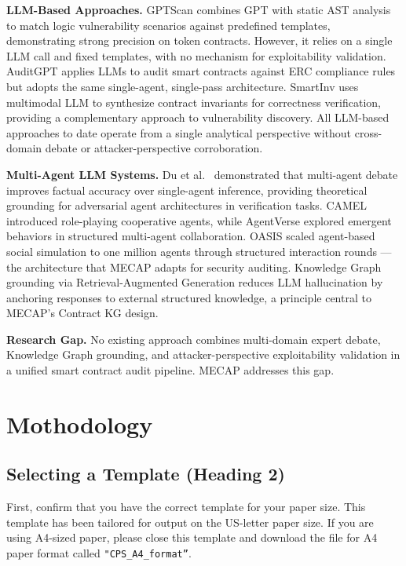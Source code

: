 \documentclass[10pt, conference, a4paper, compsocconf]{IEEEtran}
\begin{document}
\textbf{LLM-Based Approaches.}
GPTScan \cite{sun2024gptscan} combines GPT with static AST analysis to match logic vulnerability scenarios against predefined templates, demonstrating strong precision on token contracts. However, it relies on a single LLM call and fixed templates, with no mechanism for exploitability validation. AuditGPT \cite{xia2024auditgpt} applies LLMs to audit smart contracts against ERC compliance rules but adopts the same single-agent, single-pass architecture. SmartInv \cite{wang2024smartinv} uses multimodal LLM to synthesize contract invariants for correctness verification, providing a complementary approach to vulnerability discovery. All LLM-based approaches to date operate from a single analytical perspective without cross-domain debate or attacker-perspective corroboration.

\textbf{Multi-Agent LLM Systems.}
Du et al.\ \cite{du2023debate} demonstrated that multi-agent debate improves factual accuracy over single-agent inference, providing theoretical grounding for adversarial agent architectures in verification tasks. CAMEL \cite{li2023camel} introduced role-playing cooperative agents, while AgentVerse \cite{chen2023agentverse} explored emergent behaviors in structured multi-agent collaboration. OASIS \cite{yang2024oasis} scaled agent-based social simulation to one million agents through structured interaction rounds --- the architecture that MECAP adapts for security auditing. Knowledge Graph grounding via Retrieval-Augmented Generation \cite{lewis2020rag} reduces LLM hallucination by anchoring responses to external structured knowledge, a principle central to MECAP's Contract KG design.

\textbf{Research Gap.}
No existing approach combines multi-domain expert debate, Knowledge Graph grounding, and attacker-perspective exploitability validation in a unified smart contract audit pipeline. MECAP addresses this gap.

\section{Mothodology}
\subsection{Selecting a Template (Heading 2)}
First, confirm that you have the correct template for your paper size. This template has been tailored for output on the US-letter paper size. If you are using A4-sized paper, please close this template and download the file for A4 paper format called \verb+"CPS_A4_format”+.
\end{document}
